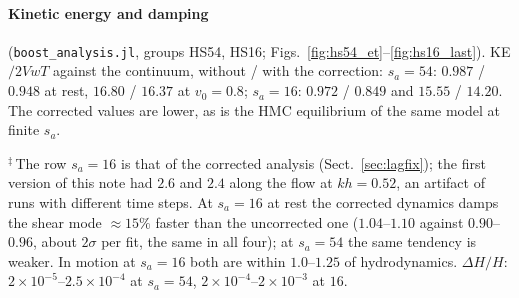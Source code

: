 \documentclass[11pt,aps,preprint,nofootinbib,superscriptaddress,tightenlines]{revtex4-2}
\def\Sect#1{Sect.~\ref{#1}}
\let\oldparagraph\paragraph
\renewcommand{\paragraph}{\par\bigskip\oldparagraph}
\begin{document}
\paragraph{Kinetic energy and damping} (\texttt{boost\_analysis.jl}, groups HS54, HS16; Figs.~\ref{fig:hs54_et}--\ref{fig:hs16_last}).  KE$/2VwT$ against the
continuum, without / with the correction: $s_a=54$: $0.987$ / $0.948$ at rest, $16.80$ / $16.37$ at $v_0=0.8$; $s_a=16$: $0.972$ / $0.849$ and $15.55$ / $14.20$.  The
corrected values are lower, as is the HMC equilibrium of the same model at finite $s_a$.
\begin{center}
\end{center}
$^\ddagger$\,The row $s_a=16$ is that of the corrected analysis (\Sect{sec:lagfix}); the first version of this note had $2.6$ and $2.4$ along the flow at
$kh=0.52$, an artifact of runs with different time steps.  At $s_a=16$ at rest the corrected dynamics damps the shear mode $\approx15\%$ faster than the
uncorrected one ($1.04$--$1.10$ against $0.90$--$0.96$, about $2\sigma$ per fit, the same in all four); at $s_a=54$ the same tendency is weaker.  In motion
at $s_a=16$ both are within $1.0$--$1.25$ of hydrodynamics.
$\Delta H/H$: $2\times10^{-5}$--$2.5\times10^{-4}$ at $s_a=54$, $2\times10^{-4}$--$2\times10^{-3}$ at $16$.
\end{document}
